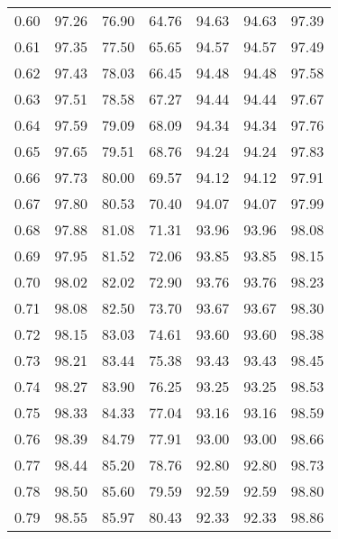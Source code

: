 \begin{tabular}{|c|c|c|c|c|c|c|}
      0.60 &     97.26 &     76.90 &      64.76 &   94.63 &      94.63 &         97.39 \\
      0.61 &     97.35 &     77.50 &      65.65 &   94.57 &      94.57 &         97.49 \\
      0.62 &     97.43 &     78.03 &      66.45 &   94.48 &      94.48 &         97.58 \\
      0.63 &     97.51 &     78.58 &      67.27 &   94.44 &      94.44 &         97.67 \\
      0.64 &     97.59 &     79.09 &      68.09 &   94.34 &      94.34 &         97.76 \\
      0.65 &     97.65 &     79.51 &      68.76 &   94.24 &      94.24 &         97.83 \\
      0.66 &     97.73 &     80.00 &      69.57 &   94.12 &      94.12 &         97.91 \\
      0.67 &     97.80 &     80.53 &      70.40 &   94.07 &      94.07 &         97.99 \\
      0.68 &     97.88 &     81.08 &      71.31 &   93.96 &      93.96 &         98.08 \\
      0.69 &     97.95 &     81.52 &      72.06 &   93.85 &      93.85 &         98.15 \\
      0.70 &     98.02 &     82.02 &      72.90 &   93.76 &      93.76 &         98.23 \\
      0.71 &     98.08 &     82.50 &      73.70 &   93.67 &      93.67 &         98.30 \\
      0.72 &     98.15 &     83.03 &      74.61 &   93.60 &      93.60 &         98.38 \\
      0.73 &     98.21 &     83.44 &      75.38 &   93.43 &      93.43 &         98.45 \\
      0.74 &     98.27 &     83.90 &      76.25 &   93.25 &      93.25 &         98.53 \\
      0.75 &     98.33 &     84.33 &      77.04 &   93.16 &      93.16 &         98.59 \\
      0.76 &     98.39 &     84.79 &      77.91 &   93.00 &      93.00 &         98.66 \\
      0.77 &     98.44 &     85.20 &      78.76 &   92.80 &      92.80 &         98.73 \\
      0.78 &     98.50 &     85.60 &      79.59 &   92.59 &      92.59 &         98.80 \\
      0.79 &     98.55 &     85.97 &      80.43 &   92.33 &      92.33 &         98.86 \\

\end{tabular}
